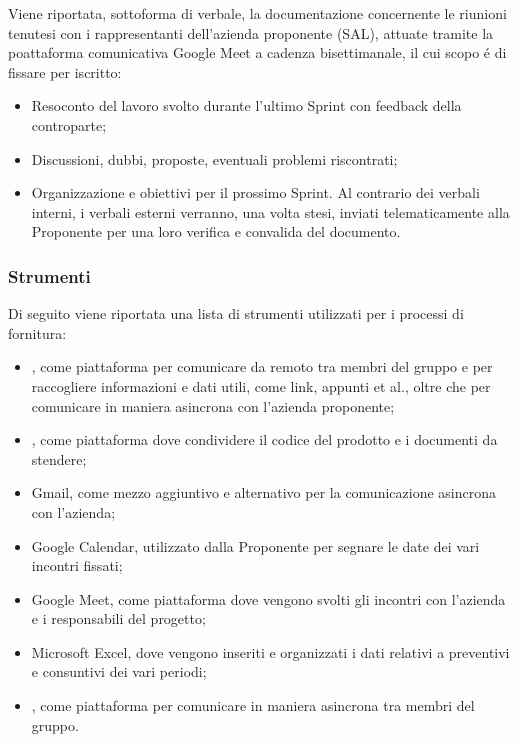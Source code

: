 Viene riportata, sottoforma di verbale, la documentazione concernente le riunioni tenutesi con i rappresentanti dell'azienda proponente (SAL), attuate tramite la poattaforma comunicativa Google Meet a cadenza bisettimanale, il cui scopo é di fissare per iscritto:
\begin{itemize}
    \item Resoconto del lavoro svolto durante l'ultimo Sprint con feedback della controparte;
    \item Discussioni, dubbi, proposte, eventuali problemi riscontrati;
    \item Organizzazione e obiettivi per il prossimo Sprint.
Al contrario dei verbali interni, i verbali esterni verranno, una volta stesi, inviati telematicamente alla Proponente per una loro verifica e convalida del documento.
\end{itemize} 
\subsubsection{Strumenti}
Di seguito viene riportata una lista di strumenti utilizzati per i processi di fornitura:
\begin{itemize}
    \item {}, come piattaforma per comunicare da remoto tra membri del gruppo e per raccogliere informazioni e dati utili, come link, appunti et al., oltre che per comunicare in maniera asincrona con l'azienda proponente;
    \item {}, come piattaforma dove condividere il codice del prodotto e i documenti da stendere;
    \item Gmail, come mezzo aggiuntivo e alternativo per la comunicazione asincrona con l'azienda;
    \item Google Calendar, utilizzato dalla Proponente per segnare le date dei vari incontri fissati;
    \item Google Meet, come piattaforma dove vengono svolti gli incontri con l'azienda e i responsabili del progetto; 
    \item Microsoft Excel, dove vengono inseriti e organizzati i dati relativi a preventivi e consuntivi dei vari periodi; 
    \item {}, come piattaforma per comunicare in maniera asincrona tra membri del gruppo. 
\end{itemize}
